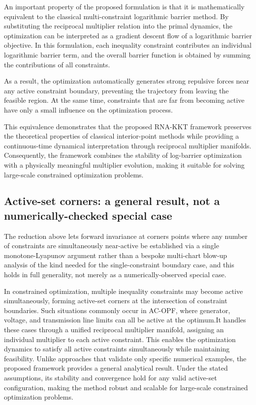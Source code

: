 \documentclass[11pt,onecolumn]{article}
\theoremstyle{definition}
\theoremstyle{remark}
\begin{document}
An important property of the proposed formulation is that it is mathematically equivalent to the classical multi-constraint logarithmic barrier method. By substituting the reciprocal multiplier relation into the primal dynamics, the optimization can be interpreted as a gradient descent flow of a logarithmic barrier objective. In this formulation, each inequality constraint contributes an individual logarithmic barrier term, and the overall barrier function is obtained by summing the contributions of all constraints.

As a result, the optimization automatically generates strong repulsive forces near any active constraint boundary, preventing the trajectory from leaving the feasible region. At the same time, constraints that are far from becoming active have only a small influence on the optimization process.

This equivalence demonstrates that the proposed RNA-KKT framework preserves the theoretical properties of classical interior-point methods while providing a continuous-time dynamical interpretation through reciprocal multiplier manifolds. Consequently, the framework combines the stability of log-barrier optimization with a physically meaningful multiplier evolution, making it suitable for solving large-scale constrained optimization problems.

\subsection{Active-set corners: a general result, not a numerically-checked special case}
The reduction above lets forward invariance at corners points where any number of
constraints are simultaneously near-active be established via a single monotone-Lyapunov
argument rather than a bespoke multi-chart blow-up analysis of the kind needed for the
single-constraint boundary case, and this holds in full generality, not merely as a
numerically-observed special case.

In constrained optimization, multiple inequality constraints may become active simultaneously, forming active-set corners at the intersection of constraint boundaries. Such situations commonly occur in AC-OPF, where generator, voltage, and transmission line limits can all be active at the optimum.It handles these cases through a unified reciprocal multiplier manifold, assigning an individual multiplier to each active constraint. This enables the optimization dynamics to satisfy all active constraints simultaneously while maintaining feasibility. Unlike approaches that validate only specific numerical examples, the proposed framework provides a general analytical result. Under the stated assumptions, its stability and convergence hold for any valid active-set configuration, making the method robust and scalable for large-scale constrained optimization problems.
\end{document}
